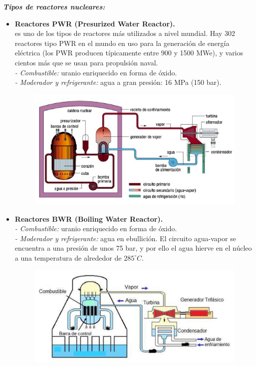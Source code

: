 			\textit{\textbf{Tipos de reactores nucleares:}}
				\begin{itemize}
					\item \textbf{Reactores PWR (Presurized Water Reactor).}\\
						es uno de los tipos de reactores más utilizados a nivel mundial. Hay 302 reactores tipo PWR en el mundo en uso para la generación de energía eléctrica (los PWR producen típicamente entre 900 y 1500 MWe), y varios cientos más que se usan para propulsión naval.\\
						\textit{- Combustible:} uranio enriquecido en forma de óxido.\\
						\textit{- Moderador y refrigerante:} agua a gran presión: 16 MPa (150 bar).
						
						\begin{figure}[H]
							\centering
							\includegraphics[width=0.7\linewidth]{res/tema1/pwr}
						\end{figure}
						
					\item \textbf{Reactores BWR (Boiling Water Reactor).}\\
						\textit{- Combustible:} uranio enriquecido en forma de óxido.\\
						\textit{- Moderador y refrigerante:} agua en ebullición. El circuito agua-vapor se encuentra a una presión de unos 75 bar, y por ello el agua hierve en el núcleo a una temperatura de alrededor de $285^\circ \textit{C}$.
						
						\begin{figure}[H]
							\centering
							\includegraphics[width=0.7\linewidth]{res/tema1/bwr}
						\end{figure}
						
				\end{itemize}

